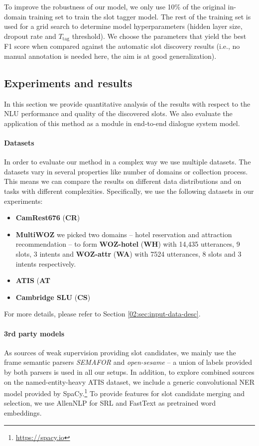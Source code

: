 To improve the robustness of our model, 
we only use 10\% of the original in-domain training set to train the slot tagger model. The rest of the training set is used for a grid search to determine model hyperparameters (hidden layer size, dropout rate and $T_{\text{tag}}$ threshold). We choose the parameters that yield the best F1 score when compared against the automatic slot discovery results (i.e., no manual annotation is needed here, the aim is at good generalization).
\subsection{Experiments and results}
\label{03:discovery_results}
In this section we provide quantitative analysis of the results with respect to the NLU performance and quality of the discovered slots.
We also evaluate the application of this method as a module in end-to-end dialogue system model.
\paragraph{Datasets}
In order to evaluate our method in a complex way we use multiple datasets.
The datasets vary in several properties like number of domains or collection process.
This means we can compare the results on different data distributions and on tasks with different complexities.
Specifically, we use the following datasets in our experiments:
\begin{itemize}
    \item \textbf{CamRest676} (\textbf{CR})
    \item \textbf{MultiWOZ} we picked two domains -- hotel reservation and attraction recommendation -- to form \textbf{WOZ-hotel} (\textbf{WH}) with 14,435 utterances, 9 slots, 3 intents and \textbf{WOZ-attr} (\textbf{WA}) with 7524 utterances, 8 slots and 3 intents respectively.
    \item \textbf{ATIS} (\textbf{AT}
    \item \textbf{Cambridge SLU} (\textbf{CS})
\end{itemize}
For more details, please refer to Section \ref{02:sec:input-data-desc}.
\paragraph{3rd party models}
As sources of weak supervision providing slot candidates, we mainly use the frame semantic parsers \textit{SEMAFOR} \cite{das2010semafor} and \textit{open-sesame} \cite{swayamdipta2017frame} -- a union of labels provided by both parsers is used in all our setups. In addition, to explore combined sources on the named-entity-heavy ATIS dataset, we include a generic convolutional NER model provided by SpaCy.\footnote{\url{https://spacy.io}}
To provide features for slot candidate merging and selection, we use AllenNLP \cite{Gardner2017AllenNLP} for SRL
and FastText \cite{bojanowski2017enriching} as pretrained word embeddings.

